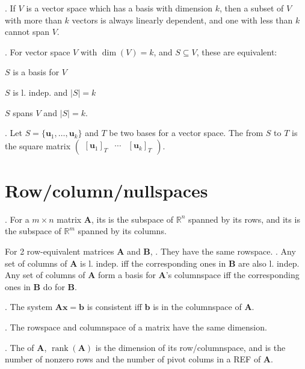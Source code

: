 \documentclass{slnotes}
\DeclareMathOperator*{\rank}{rank}
\begin{document}
. If \(V\) is a vector space which has a basis with dimension \(k\), then a subset of \(V\) with more than \(k\) vectors is always linearly dependent, and one with less than \(k\) cannot span \(V\).

. For vector space \(V\) with \(\dim(V) = k\), and \(S \subseteq V\), these are equivalent: \begin{slinenum}
\item \(S\) is a basis for \(V\)
\item \(S\) is l. indep. and \(\lvert S \rvert = k\)
\item \(S\) spans \(V\) and \(\lvert S \rvert = k\).
\end{slinenum}

. Let \(S = \{\mathbf{u}_1, \hdots, \mathbf{u}_k\}\) and \(T\) be two bases for a vector space. The  from \(S\) to \(T\) is the square matrix \(\begin{pmatrix}[\mathbf{u}_1]_T & \cdots & [\mathbf{u}_k]_T\end{pmatrix}\).

\chapter{Row/column/nullspaces}
. For a \(m \times n\) matrix \(\mathbf A\), its  is the subspace of \(\mathbb{R}^n\) spanned by its rows, and its  is the subspace of \(\mathbb{R}^m\) spanned by its columns.

For 2 row-equivalent matrices \(\mathbf A\) and \(\mathbf B\), . They have the same rowspace. . Any set of columns of \(\mathbf A\) is l. indep. iff the corresponding ones in \(\mathbf B\) are also l. indep. Any set of columns of \(\mathbf A\) form a basis for \(\mathbf{A}\)'s columnspace iff the corresponding ones in \(\mathbf B\) do for \(\mathbf{B}\).

. The system \(\mathbf{Ax} = \mathbf b\) is consistent iff \(\mathbf b\) is in the columnspace of \(\mathbf A\).

. The rowspace and columnspace of a matrix have the same dimension.

. The  of \(\mathbf A\), \(\rank(\mathbf A)\) is the dimension of its row/columnspace, and is the number of nonzero rows and the number of pivot colums in a REF of \(\mathbf A\).
\end{document}
